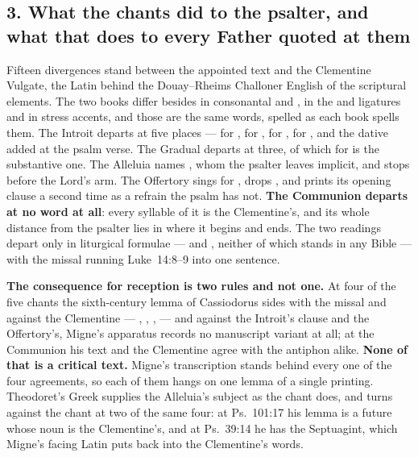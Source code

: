 \subsection*{3. What the chants did to the psalter, and what that does to every Father quoted at them}

Fifteen divergences stand between the appointed text and the Clementine Vulgate,
the Latin behind the Douay--Rheims Challoner English of the scriptural elements.
The two books differ besides in
consonantal  and , in the  and  ligatures and in
stress accents, and those are the same words, spelled as each book spells them.
The Introit departs at
five places ---  for ,  for
,  for ,
 for , and the dative
added at the psalm verse. The Gradual departs at three, of which
 for  is the substantive one. The Alleluia names
, whom the psalter leaves implicit, and stops before the Lord's
arm. The Offertory sings  for , drops , and prints its opening clause a
second time as a refrain the psalm has not. \textbf{The Communion departs at no word
at all}: every syllable of it is the Clementine's, and its whole distance from
the psalter lies in where it begins and ends. The two readings depart only in liturgical formulae
---  and , neither of which
stands in any Bible --- with the missal running Luke~14:8--9 into one sentence.

\textbf{The consequence for reception is two rules and not one.} At four of the
five chants the sixth-century lemma of Cassiodorus sides with the missal and
against the Clementine --- ,
, ,
 --- and against the Introit's clause and
the Offertory's, Migne's apparatus records no manuscript variant at all; at the
Communion his text and the Clementine agree with the antiphon alike.
\textbf{None of that is a critical text.} Migne's transcription stands behind
every one of the four agreements, so each of them hangs on one lemma of a
single printing. Theodoret's Greek supplies the Alleluia's subject as the chant
does, and turns against the chant at two of the same four: at Ps.~101:17 his lemma is a
future whose noun is the Clementine's, and at Ps.~39:14 he has the Septuagint,
which Migne's facing Latin puts back into the Clementine's words.

